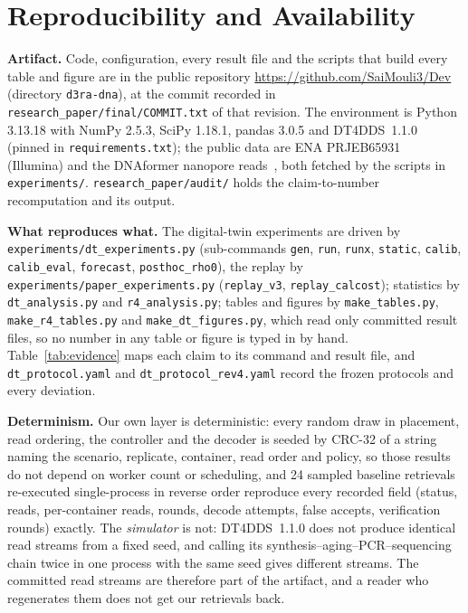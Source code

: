 \documentclass[conference,onecolumn,11pt]{IEEEtran}
\begin{document}
\section{Reproducibility and Availability}\label{sec:repro}
\textbf{Artifact.}  Code, configuration, every result file and the scripts that build every table and
figure are in the public repository \url{https://github.com/SaiMouli3/Dev} (directory
\texttt{d3ra-dna}), at the commit recorded in \texttt{research\_paper/final/COMMIT.txt} of that
revision.  The environment is Python 3.13.18 with NumPy 2.5.3, SciPy 1.18.1, pandas 3.0.5 and
DT4DDS~1.1.0 (pinned in \texttt{requirements.txt}); the public data are ENA
PRJEB65931~\cite{gimpel2023prjeb65931} (Illumina) and the DNAformer nanopore
reads~\cite{technion2025dnaformerreads,barlev2024binned}, both fetched by the scripts in
\texttt{experiments/}.  \texttt{research\_paper/audit/} holds the claim-to-number recomputation and its
output.

\textbf{What reproduces what.}  The digital-twin experiments are driven by
\texttt{experiments/dt\_experiments.py} (sub-commands \texttt{gen}, \texttt{run}, \texttt{runx},
\texttt{static}, \texttt{calib}, \texttt{calib\_eval}, \texttt{forecast}, \texttt{posthoc\_rho0}), the
replay by \texttt{experiments/paper\_experiments.py} (\texttt{replay\_v3}, \texttt{replay\_calcost});
statistics by \texttt{dt\_analysis.py} and \texttt{r4\_analysis.py}; tables and figures by
\texttt{make\_tables.py}, \texttt{make\_r4\_tables.py} and \texttt{make\_dt\_figures.py}, which read
only committed result files, so no number in any table or figure is typed in by hand.
Table~\ref{tab:evidence} maps each claim to its command and result file, and
\texttt{dt\_protocol.yaml} and \texttt{dt\_protocol\_rev4.yaml} record the frozen protocols and every
deviation.

\textbf{Determinism.}  Our own layer is deterministic: every random draw
in placement, read ordering, the controller and the decoder is seeded by CRC-32 of a string naming the
scenario, replicate, container, read order and policy, so those results do not depend on worker count or
scheduling, and 24 sampled baseline retrievals re-executed single-process in reverse order reproduce
every recorded field (status, reads, per-container reads, rounds, decode attempts, false accepts,
verification rounds) exactly.  The \emph{simulator} is not: DT4DDS~1.1.0 does not produce identical read
streams from a fixed seed, and calling its synthesis--aging--PCR--sequencing chain twice in one process
with the same seed gives different streams.  The committed read streams are therefore part of the
artifact, and a reader who regenerates them does not get our retrievals back.
\end{document}
